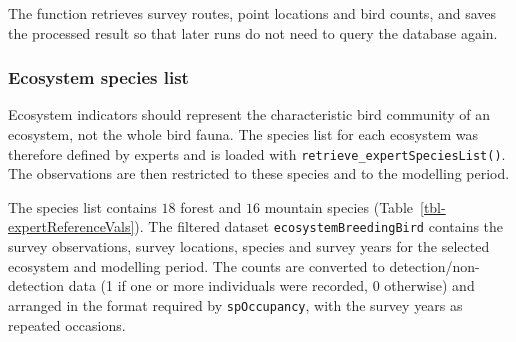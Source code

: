 \documentclass[
  letterpaper,
  DIV=11,
  numbers=noendperiod]{scrartcl}
\newenvironment{Shaded}{\begin{snugshade}}{\end{snugshade}}
\newcommand{\AttributeTok}[1]{\textcolor[rgb]{0.40,0.45,0.13}{#1}}
\newcommand{\CommentTok}[1]{\textcolor[rgb]{0.37,0.37,0.37}{#1}}
\newcommand{\DecValTok}[1]{\textcolor[rgb]{0.68,0.00,0.00}{#1}}
\newcommand{\FunctionTok}[1]{\textcolor[rgb]{0.28,0.35,0.67}{#1}}
\newcommand{\NormalTok}[1]{\textcolor[rgb]{0.00,0.23,0.31}{#1}}
\newcommand{\OtherTok}[1]{\textcolor[rgb]{0.00,0.23,0.31}{#1}}
\newcommand{\SpecialCharTok}[1]{\textcolor[rgb]{0.37,0.37,0.37}{#1}}
\begin{document}
The function retrieves survey routes, point locations and bird counts,
and saves the processed result so that later runs do not need to query
the database again.

\subsubsection{Ecosystem species list}\label{ecosystem-species-list}

Ecosystem indicators should represent the characteristic bird community
of an ecosystem, not the whole bird fauna. The species list for each
ecosystem was therefore defined by experts and is loaded with
\texttt{retrieve\_expertSpeciesList()}. The observations are then
restricted to these species and to the modelling period.

\begin{Shaded}
\end{Shaded}

The species list contains \(18\) forest and \(16\) mountain species
(Table~\ref{tbl-expertReferenceVals}). The filtered dataset
\texttt{ecosystemBreedingBird} contains the survey observations, survey
locations, species and survey years for the selected ecosystem and
modelling period. The counts are converted to detection/non-detection
data (1 if one or more individuals were recorded, 0 otherwise) and
arranged in the format required by \texttt{spOccupancy}, with the survey
years as repeated occasions.
\end{document}
